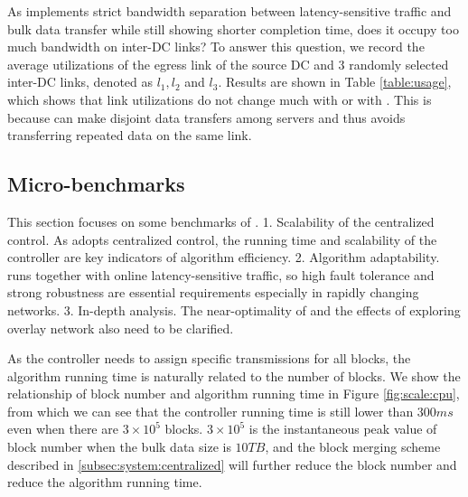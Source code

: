 As \name implements strict bandwidth separation between latency-sensitive traffic and bulk data transfer while still showing shorter completion time, does it occupy too much bandwidth on inter-DC links? To answer this question, we record the average utilizations of the egress link of the source DC and 3 randomly selected inter-DC links, denoted as $l_1,l_2$ and $l_3$. Results are shown in Table \ref{table:usage}, which shows that link utilizations do not change much with \name or with \company. This is because \name can make disjoint data transfers among servers and thus avoids transferring repeated data on the same link.


\subsection{Micro-benchmarks}
\label{subsec:evaluation:benchmarks}

This section focuses on some benchmarks of \name. 1. Scalability of the centralized control. As \name adopts centralized control, the running time and scalability of the controller are key indicators of algorithm efficiency. 2. Algorithm adaptability. \name runs together with online latency-sensitive traffic, so high fault tolerance and strong robustness are essential requirements especially in rapidly changing networks. 3. In-depth analysis. The near-optimality of \name and the effects of exploring overlay network also need to be clarified.

\label{subsec:evaluation:benchmarks:scalability}

 As the controller needs to assign specific transmissions for all blocks, the algorithm running time is naturally related to the number of blocks. We show the relationship of block number and algorithm running time in Figure \ref{fig:scale:cpu}, from which we can see that the controller running time is still lower than $300ms$ even when there are $3\times 10^5$ blocks. $3\times 10^5$ is the instantaneous peak value of block number when the bulk data size is $10TB$, and the block merging scheme described in \Section\ref{subsec:system:centralized} will further reduce the block number and reduce the algorithm running time.

